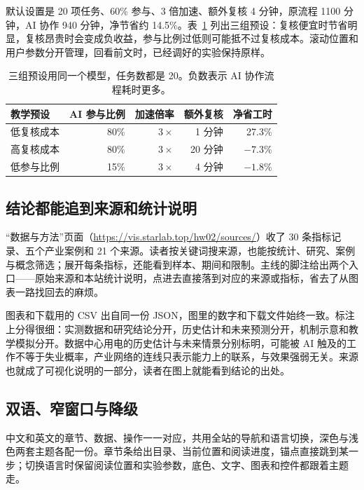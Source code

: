\documentclass[UTF8,a4paper,11pt,fontset=fandol]{ctexart}
\begin{document}
默认设置是 20 项任务、60\% 参与、3 倍加速、额外复核 4 分钟，原流程 1100 分钟，AI 协作 940 分钟，净节省约 14.5\%。表~\ref{tab:presets} 列出三组预设：复核便宜时节省明显，复核昂贵时会变成负收益，参与比例过低则可能抵不过复核成本。滚动位置和用户参数分开管理，回看前文时，已经调好的实验保持原样。

\begin{table}[htbp]
  \centering
  \small
  \begin{tabular}{lrrrr}
    \toprule
    教学预设 & AI 参与比例 & 加速倍率 & 额外复核 & 净省工时 \\
    \midrule
    低复核成本 & 80\% & $3\times$ & 1 分钟 & 27.3\% \\
    高复核成本 & 80\% & $3\times$ & 20 分钟 & $-7.3\%$ \\
    低参与比例 & 15\% & $3\times$ & 4 分钟 & $-1.8\%$ \\
    \bottomrule
  \end{tabular}
  \caption{三组预设用同一个模型，任务数都是 20。负数表示 AI 协作流程耗时更多。}
  \label{tab:presets}
\end{table}

\subsection{结论都能追到来源和统计说明}

“数据与方法”页面（\url{https://vis.starlab.top/hw02/sources/}）收了 30 条指标记录、五个产业案例和 21 个来源。读者按关键词搜来源，也能按统计、研究、案例与概念筛选；展开每条指标，还能看到样本、期间和限制。主线的脚注给出两个入口——原始来源和本站统计说明，点进去直接落到对应的来源或指标，省去了从图表一路找回去的麻烦。

图表和下载用的 CSV 出自同一份 JSON，图里的数字和下载文件始终一致。标注上分得很细：实测数据和研究结论分开，历史估计和未来预测分开，机制示意和教学模拟分开。数据中心用电的历史估计与未来情景分别标明，可能被 AI 触及的工作不等于失业概率，产业网络的连线只表示能力上的联系，与效果强弱无关。来源也就成了可视化说明的一部分，读者在图上就能看到结论的出处。

\subsection{双语、窄窗口与降级}

中文和英文的章节、数据、操作一一对应，共用全站的导航和语言切换，深色与浅色两套主题各配一份。章节条给出目录、当前位置和阅读进度，锚点直接跳到某一步；切换语言时保留阅读位置和实验参数，底色、文字、图表和控件都跟着主题走。
\end{document}
